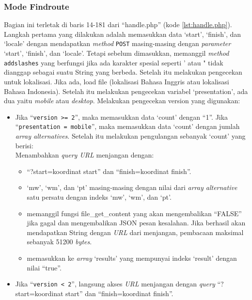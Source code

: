 \subsubsection{Mode Findroute}
Bagian ini terletak di baris 14-181 dari ``handle.php'' (kode \ref{lst:handle.php}). Langkah pertama yang dilakukan adalah memasukkan data `start', `finish', dan `locale' dengan mendapatkan \textit{method} \verb!POST! masing-masing dengan \textit{parameter} `start', `finish', dan `locale'. Tetapi sebelum dimasukkan, memanggil \textit{method} \verb!addslashes! yang berfungsi jika ada karakter spesial seperti ' atau " tidak dianggap sebagai suatu String yang berbeda. Setelah itu melakukan pengecekan untuk lokalisasi. Jika ada, load file (lokalisasi Bahasa Inggris atau lokalisasi Bahasa Indonesia). Setelah itu melakukan pengecekan variabel `presentation', ada dua yaitu  \textit{mobile} atau \textit{desktop}. Melakukan pengecekan version yang digunakan:
\begin{itemize}
	\item Jika ``\texttt{version >= 2}'', maka memasukkan data `count' dengan ``1''. Jika ``\texttt{presentation = mobile}'', maka memasukkan data `count' dengan jumlah \textit{array alternatives}. Setelah itu melakukan pengulangan sebanyak `count' yang berisi:\\
		Menambahkan \textit{query URL} menjangan dengan:
		\begin{itemize}
			\item 	``?start=koordinat start'' dan ``finish=koordinat finish''.
			\item `mw', `wm', dan `pt' masing-masing dengan nilai dari \textit{array alternative} satu persatu dengan indeks `mw', `wm', dan `pt'.
			\item memanggil fungsi file\_get\_content yang akan mengembalikan ``FALSE'' jika gagal dan mengembalikan JSON pesan kesalahan. Jika berhasil akan mendapatkan String dengan \textit{URL} dari menjangan, pembacaan maksimal sebanyak 51200 \textit{bytes}.
			\item memasukkan ke \textit{array} `results' yang mempunyai indeks `result' dengan nilai ``true''.
		\end{itemize}
	\item Jika ``\texttt{version < 2}'', langsung akses \textit{URL} menjangan dengan \textit{query} ``?start=koordinat start'' dan ``finish=koordinat finish''.
\end{itemize}

